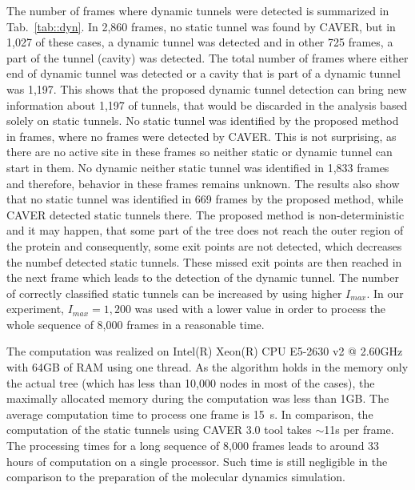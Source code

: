 \documentclass[usletter, 10pt, conference]{svjour3}      %
\def\Imax{I_{max}} %
\begin{document}
The number of frames where dynamic tunnels were detected is summarized in Tab.~\ref{tab::dyn}.
In 2,860 frames, no static tunnel was found by CAVER, but  in 1,027 of these cases, a dynamic tunnel was detected and
in other 725 frames, a part of the tunnel (cavity) was detected.
The total number of frames where either end of dynamic tunnel was detected or a cavity that is part of a dynamic tunnel was
1,197.
This shows that the proposed dynamic tunnel detection can bring new information about 1,197 of tunnels, that would be 
discarded in the analysis based solely on static tunnels.
No static tunnel was identified by the proposed method in frames, where no frames were detected by CAVER.
This is not surprising, as there are no active site in these frames so neither static or dynamic tunnel can start in them.
No dynamic neither static tunnel was identified in 1,833 frames and therefore, behavior in these frames  remains unknown.
The results also show that no static tunnel was identified in 669 frames by the proposed method, while CAVER detected static tunnels there.
%
%
The proposed method is non-deterministic and it may happen, that some part of the tree does not reach the outer region of the protein and consequently, some exit points are not detected, which decreases the numbef detected static tunnels.
These missed exit points are then reached in the next frame which leads to the detection of the dynamic tunnel.
The number of correctly classified static tunnels can be increased by using higher $\Imax$.
In our experiment, $\Imax=1,200$ was used with a lower value in order to process the whole sequence of 8,000 frames in a reasonable time.

The computation was realized on Intel(R) Xeon(R) CPU E5-2630 v2 @ 2.60GHz with 64GB of RAM using one thread.
As the algorithm holds in the memory only the actual tree (which has less than 10,000 nodes in most of the cases),
the maximally allocated memory during the computation was less than 1GB.
The average computation time to process one frame is 15~s.
In comparison, the computation of the static tunnels using CAVER 3.0 tool takes $\sim$11s per frame.
The processing times for a long sequence of 8,000 frames leads to around 33 hours of computation on a single processor.
Such time is still negligible in the comparison to the preparation of the molecular dynamics simulation.
\end{document}
